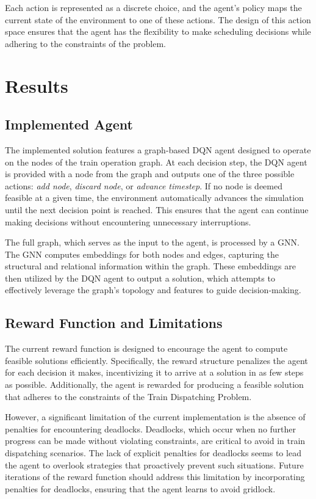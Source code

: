 \documentclass[runningheads]{llncs}
\begin{document}
Each action is represented as a discrete choice, and the agent's policy maps the current state of the environment to one of these actions. 
The design of this action space ensures that the agent has the flexibility to make scheduling decisions while adhering to the constraints of the problem.

\section{Results}
\label{sse:results}

\subsection{Implemented Agent}
The implemented solution features a graph-based DQN agent designed to operate on the nodes of the train operation graph. 
At each decision step, the DQN agent is provided with a node from the graph and outputs one of the three possible actions: \textit{add node}, \textit{discard node}, or \textit{advance timestep}. 
If no node is deemed feasible at a given time, the environment automatically advances the simulation until the next decision point is reached. 
This ensures that the agent can continue making decisions without encountering unnecessary interruptions.

The full graph, which serves as the input to the agent, is processed by a GNN. 
The GNN computes embeddings for both nodes and edges, capturing the structural and relational information within the graph. 
These embeddings are then utilized by the DQN agent to output a solution, which attempts to effectively leverage the graph's topology and features to guide decision-making.

\subsection{Reward Function and Limitations}
The current reward function is designed to encourage the agent to compute feasible solutions efficiently. 
Specifically, the reward structure penalizes the agent for each decision it makes, incentivizing it to arrive at a solution in as few steps as possible. Additionally, the agent is rewarded for producing a feasible solution that adheres to the constraints of the Train Dispatching Problem.

However, a significant limitation of the current implementation is the absence of penalties for encountering deadlocks. 
Deadlocks, which occur when no further progress can be made without violating constraints, are critical to avoid in train dispatching scenarios. 
The lack of explicit penalties for deadlocks seems to lead the agent to overlook strategies that proactively prevent such situations. 
Future iterations of the reward function should address this limitation by incorporating penalties for deadlocks, ensuring that the agent learns to avoid gridlock.
\end{document}

